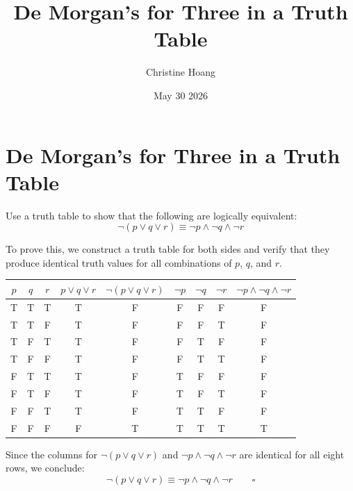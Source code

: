 \documentclass{article}
\title{De Morgan's for Three in a Truth Table}
\author{Christine Hoang}
\date{May 30 2026}
\begin{document}
\maketitle

\section{De Morgan's for Three in a Truth Table}

 Use a truth table to show that the following are logically equivalent:
\[
\neg(p \vee q \vee r) \equiv \neg p \wedge \neg q \wedge \neg r
\]

To prove this, we construct a truth table for both sides and verify that they produce identical truth values for all combinations of $p$, $q$, and $r$.

\vspace{1em}

\begin{center}
\begin{tabular}{ccc|c|c|ccc|c}
\toprule
$p$ & $q$ & $r$ & $p \vee q \vee r$ & $\neg(p \vee q \vee r)$ & $\neg p$ & $\neg q$ & $\neg r$ & $\neg p \wedge \neg q \wedge \neg r$ \\
\midrule
T & T & T & T & F & F & F & F & F \\
T & T & F & T & F & F & F & T & F \\
T & F & T & T & F & F & T & F & F \\
T & F & F & T & F & F & T & T & F \\
F & T & T & T & F & T & F & F & F \\
F & T & F & T & F & T & F & T & F \\
F & F & T & T & F & T & T & F & F \\
F & F & F & F & T & T & T & T & T \\
\bottomrule
\end{tabular}
\end{center}

\vspace{1em}

Since the columns for $\neg(p \vee q \vee r)$ and $\neg p \wedge \neg q \wedge \neg r$ are identical for all eight rows, we conclude:
\[
\neg(p \vee q \vee r) \equiv \neg p \wedge \neg q \wedge \neg r \qquad \square
\]
\end{document}
